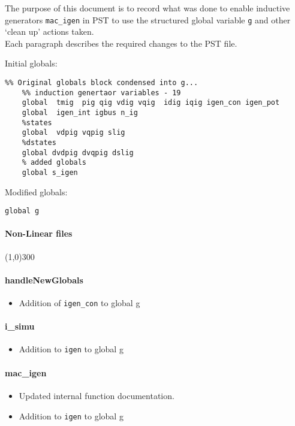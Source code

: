 \documentclass[12pt]{article}
\begin{document}
The purpose of this document is to record what was done to enable inductive generators \verb|mac_igen| in PST to use the structured global variable \verb|g| and other `clean up' actions taken. \\
Each paragraph describes the required changes to the PST file.

Initial globals:
\begin{verbatim}
%% Original globals block condensed into g...
    %% induction genertaor variables - 19
    global  tmig  pig qig vdig vqig  idig iqig igen_con igen_pot
    global  igen_int igbus n_ig
    %states
    global  vdpig vqpig slig
    %dstates
    global dvdpig dvqpig dslig
    % added globals
    global s_igen
\end{verbatim}

Modified globals:
\begin{verbatim}
global g
\end{verbatim}
\paragraph{Non-Linear files}\line(1,0){300}
\paragraph{handleNewGlobals}
	\begin{itemize}
		\item Addition of \verb|igen_con| to global g
	\end{itemize}
\paragraph{i\_simu}
	\begin{itemize}
		\item Addition to \verb|igen| to global g
	\end{itemize}

\paragraph{mac\_igen}
	\begin{itemize}
		\item Updated internal function documentation.
		\item Addition to \verb|igen| to global g
	\end{itemize}
	
\end{document}
